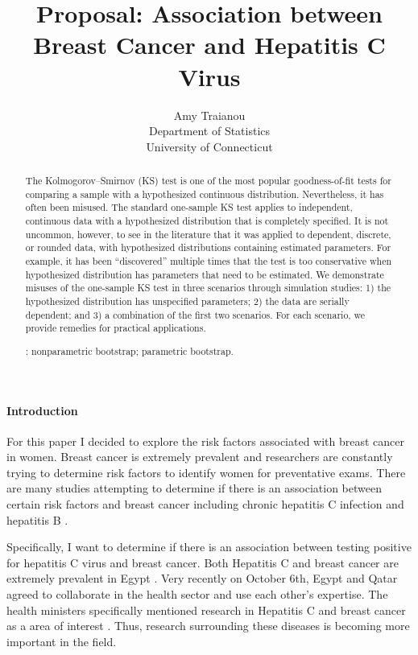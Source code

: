 \documentclass[12pt, titlepage]{article}
\title{Proposal: Association between Breast Cancer and Hepatitis C Virus}
\author{Amy Traianou\\
  Department of Statistics\\
  University of Connecticut
}
\begin{document}
\maketitle

\doublespace

\begin{abstract}
The Kolmogorov--Smirnov (KS) test is one of the most popular goodness-of-fit
tests for comparing a sample with a hypothesized continuous distribution.
Nevertheless, it has often been misused. The standard one-sample KS test applies
to independent, continuous data with a hypothesized distribution that is
completely specified. It is not uncommon, however, to see in the literature that
it was applied to dependent, discrete, or rounded data, with hypothesized
distributions containing estimated parameters. For example, it has been
``discovered'' multiple times that the test is too conservative when
hypothesized distribution has parameters that need to be estimated.
We demonstrate misuses of the one-sample KS test in
three scenarios through simulation studies:
1) the hypothesized distribution has unspecified parameters;
2) the data are serially dependent; and
3) a combination of the first two scenarios.
For each scenario, we provide remedies for practical applications.

\bigskip
{}:
nonparametric bootstrap;
parametric bootstrap.
\end{abstract}


\paragraph{Introduction}
\label{sec:intro}
For this paper I decided to explore the risk factors associated with breast cancer in women. Breast cancer is extremely
prevalent and researchers are constantly trying to determine risk factors to identify women for preventative exams.
There are many studies attempting to determine if there is an association between certain risk factors and 
breast cancer including chronic hepatitis C infection \citep{Larrey2010is} and hepatitis B \citep{vishnu2016does}. 

Specifically, I want to determine if there is an association between testing positive for hepatitis C virus
and breast cancer. Both Hepatitis C and breast cancer are extremely prevalent in Egypt \citep{Hussein2021high}. 
Very recently on October 6th, Egypt and Qatar agreed to collaborate in the health sector and use each 
other's expertise. The health ministers specifically mentioned research in Hepatitis C and breast cancer
as a area of interest \citep{arham2022egypt}. Thus, research surrounding these diseases is becoming more
important in the field. 
\end{document}
